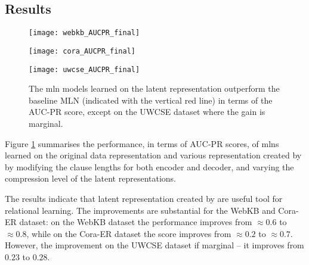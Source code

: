 \subsection{Results}



\begin{figure}
	\centering
    \begin{minipage}[thb]{.32\linewidth}
        \centering
        \texttt{[image: webkb\_AUCPR\_final]}
    \end{minipage}
    \begin{minipage}[htb]{.32\linewidth}
        \centering
        \texttt{[image: cora\_AUCPR\_final]}
    \end{minipage}
    \begin{minipage}[htb]{.32\linewidth}
        \centering
        \texttt{[image: uwcse\_AUCPR\_final]}
    \end{minipage}
    \caption[Performance of the \gls{mln} models learned on the original and -induced data representations.]{The \gls{mln} models learned on the latent representation outperform the baseline MLN (indicated with the vertical red line) in terms of the AUC-PR score, except on the UWCSE dataset where the gain is marginal.}
    \label{fig:resultsAUCPR}
\end{figure}





Figure \ref{fig:resultsAUCPR} summarises the performance, in terms of AUC-PR scores, of \gls{mln}s learned on the original data representation and various representation created by  by modifying the clause lengths for both encoder and decoder, and varying the compression level of the latent representations.




The results indicate that latent representation created by  are useful tool for relational learning.
The improvements are substantial for the WebKB and Cora-ER dataset: on the WebKB dataset the performance improves from $\approx 0.6$ to $\approx 0.8$, while on the Cora-ER dataset the score improves from $\approx 0.2$ to $\approx 0.7$.
However, the improvement on the UWCSE dataset if marginal -- it improves from $0.23$ to $0.28$.



